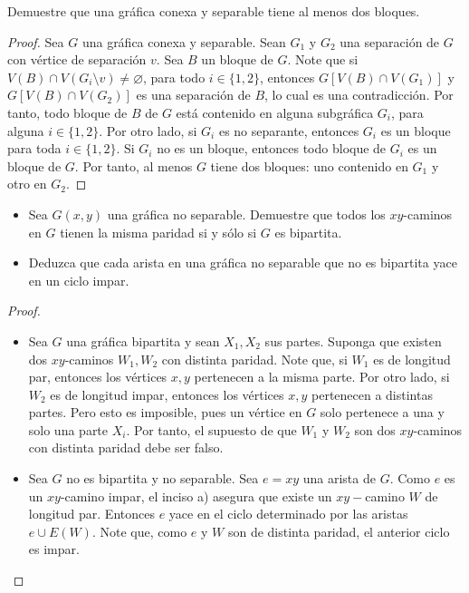 \documentclass[12pt]{article}
\newenvironment{problem}[2][Problema]{\begin{trivlist}
\item[\hskip \labelsep {\bfseries #1}\hskip \labelsep {\bfseries #2.}]}{\end{trivlist}}
\begin{document}

\begin{problem}{5.2.4} Demuestre que una gráfica conexa y separable tiene al menos dos bloques.
\end{problem}
\begin{proof}
Sea $G$ una gráfica conexa y separable. Sean $G_1$ y $G_2$ una separación de $G$ con vértice de separación $v.$  Sea $B$ un bloque de $G.$ Note que si $V(B) \cap V(G_i \setminus v)\neq \varnothing$, para todo $i\in\{1,2\}$, entonces $G[V(B) \cap V(G_1)]$ y $G[V(B) \cap V(G_2)]$ es una separación de $B$, lo cual es una contradicción. Por tanto, todo bloque de $B$ de $G$ está contenido en alguna subgráfica $G_i$, para alguna $i\in\{1,2\}.$ 
Por otro lado, si $G_i$ es no separante, entonces $G_i$ es un bloque para toda $i\in\{1,2\}$. Si $G_i$ no es un bloque, entonces todo bloque de $G_i$ es un bloque de $G.$ Por tanto, al menos $G$ tiene dos bloques: uno contenido en $G_1$ y otro en $G_2.$
\end{proof}

\begin{problem}{5.2.7} \text{}
\begin{itemize}
    \item[a)] Sea $G(x,y)$ una gráfica no separable. Demuestre que todos los $xy$-caminos en $G$ tienen la misma paridad si y sólo si $G$ es bipartita.
    \item[b)] Deduzca que cada arista en una gráfica no separable que no es bipartita yace en un ciclo impar. 
\end{itemize}
\end{problem}
\begin{proof}
\text{}
\begin{itemize}
    \item[a)] Sea $G$ una gráfica bipartita y sean $X_1, X_2$ sus partes. Suponga que existen dos $xy$-caminos $W_1, W_2$ con distinta paridad. Note que, si $W_1$ es de longitud par, entonces los vértices $x,y$ pertenecen a la misma parte. Por otro lado, si $W_2$ es de longitud impar, entonces los vértices $x,y$ pertenecen a distintas partes. Pero esto es imposible, pues un vértice en $G$ solo pertenece a una y solo una parte $X_i.$ Por tanto, el supuesto de que $W_1$ y $W_2$ son dos $xy$-caminos con distinta paridad debe ser falso.
    
    
    
    \item[b)] Sea $G$ no es bipartita y no separable. Sea $e=xy$ una arista de $G.$  Como $e$ es un $xy$-camino impar, el inciso a) asegura que existe un $xy-$camino $W$ de longitud par. Entonces $e$ yace en el ciclo determinado por las aristas $e \cup E(W).$ Note que, como $e$ y $W$ son de distinta paridad, el anterior ciclo es impar.
\end{itemize}
\end{proof}

\printbibliography
\end{document}
